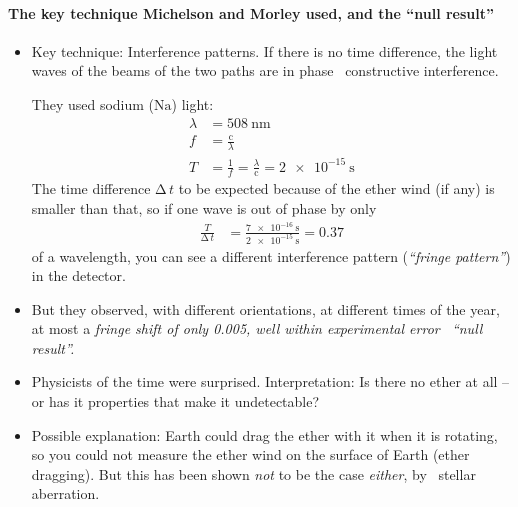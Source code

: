 \documentclass[pagesize,headsepline,10pt,parskip=half]{scrreprt}
\newcommand*\mdelta[1]{\ensuremath{\mathrm{\Delta\,}#1}}
\newcommand*\chem[1]{\ensuremath{\mathrm{#1}}}
\newcommand{\const}[1]{\ensuremath{\mathrm{#1}}}
\renewcommand{\c}{\const{c}}
\begin{document}
        \paragraph{The key technique Michelson and Morley used, and the “null result”}
          \begin{itemize}
            \item \begin{samepage}Key technique: Interference patterns.
              If there is no time difference, the light waves of the beams
              of the two paths are in phase \rightarrow~constructive interference.

              They used sodium (\chem{Na}) light:
              \begin{align*}
                \lambda &= \SI{508}{\nano\meter}\\
                f &= \frac{\c}{\lambda}\\
                T &= \frac{1}{f} = \frac{\lambda}{\c} = \SI{2e-15}{\second}
              \end{align*}
              The time difference \mdelta{t} to be expected because of
              the ether wind (if any) is smaller than that, so if one wave
              is out of phase by only
              \begin{align*}
                \frac{T}{\mdelta{t}} &= \frac{\SI{7e-16}{\second}}{\SI{2e-15}{\second}} = 0.37
              \end{align*}
              of a wavelength, you can see a different interference pattern
              (\emph{“fringe pattern”}) in the detector.\end{samepage}
            \item But they observed, with different orientations, at different
              times of the year, at most a \emph{fringe shift of
              only 0.005, well within experimental error
              \rightarrow~“null result”.}
            \item Physicists of the time were surprised.  Interpretation:
              Is there no ether at all {--} or has it properties that make it
              undetectable?
            \item Possible explanation: Earth could drag the ether with it
              when it is rotating, so you could not measure the ether wind on
              the surface of Earth (ether dragging).  But this has been shown
              \emph{not} to be the case \emph{either}, by
              \rightarrow~stellar aberration.
          \end{itemize}
\end{document}
